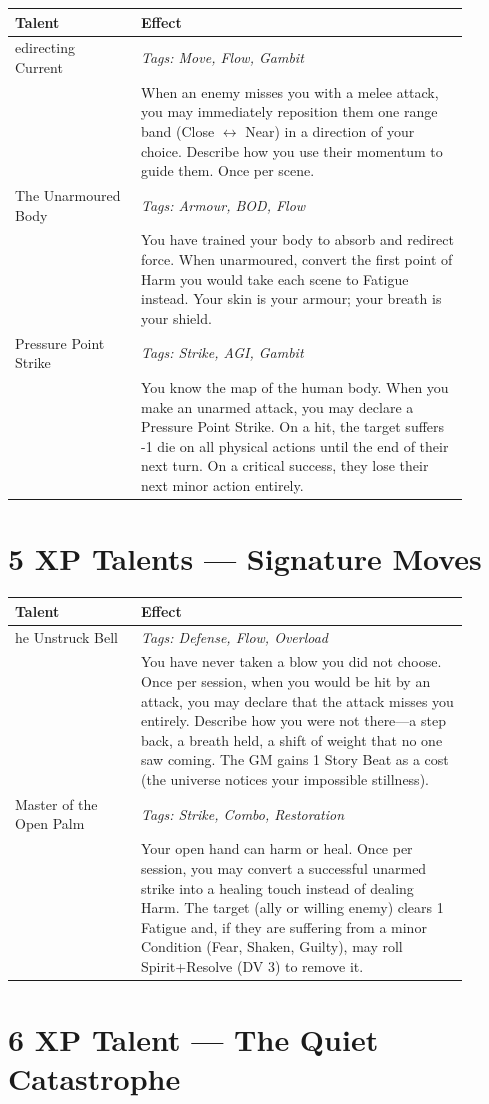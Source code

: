 \documentclass[11pt]{book}
\newenvironment{traittable}[1]
  {\begin{supertabular}{p{0.25\linewidth}p{0.65\linewidth}} \hline \textbf{Talent} & \textbf{Effect} \\ \hline}
  {\end{supertabular}}
\begin{document}
\begin{traittable}
Redirecting Current & \textit{Tags: Move, Flow, Gambit} \\
& When an enemy misses you with a melee attack, you may immediately reposition them one range band (Close $\leftrightarrow$ Near) in a direction of your choice. Describe how you use their momentum to guide them. Once per scene. \\
The Unarmoured Body & \textit{Tags: Armour, BOD, Flow} \\
& You have trained your body to absorb and redirect force. When unarmoured, convert the first point of Harm you would take each scene to Fatigue instead. Your skin is your armour; your breath is your shield. \\
Pressure Point Strike & \textit{Tags: Strike, AGI, Gambit} \\
& You know the map of the human body. When you make an unarmed attack, you may declare a Pressure Point Strike. On a hit, the target suffers -1 die on all physical actions until the end of their next turn. On a critical success, they lose their next minor action entirely.
\end{traittable}

\section{5 XP Talents --- Signature Moves}

\begin{traittable}
The Unstruck Bell & \textit{Tags: Defense, Flow, Overload} \\
& You have never taken a blow you did not choose. Once per session, when you would be hit by an attack, you may declare that the attack misses you entirely. Describe how you were not there---a step back, a breath held, a shift of weight that no one saw coming. The GM gains 1 Story Beat as a cost (the universe notices your impossible stillness). \\
Master of the Open Palm & \textit{Tags: Strike, Combo, Restoration} \\
& Your open hand can harm or heal. Once per session, you may convert a successful unarmed strike into a healing touch instead of dealing Harm. The target (ally or willing enemy) clears 1 Fatigue and, if they are suffering from a minor Condition (Fear, Shaken, Guilty), may roll Spirit+Resolve (DV 3) to remove it.
\end{traittable}

\section{6 XP Talent --- The Quiet Catastrophe}
\end{document}
